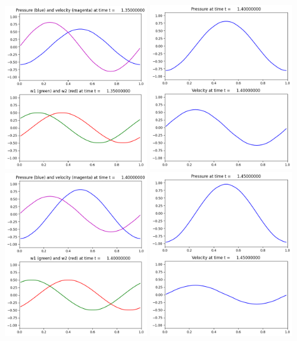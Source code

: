 \documentclass[11pt]{article}
\begin{document}
\includegraphics[width=0.475\textwidth]{frame0027fig2.png}
\vskip 10pt 
\includegraphics[width=0.475\textwidth]{frame0028fig1.png}
\includegraphics[width=0.475\textwidth]{frame0028fig2.png}
\vskip 10pt 
\includegraphics[width=0.475\textwidth]{frame0029fig1.png}
\end{document}
